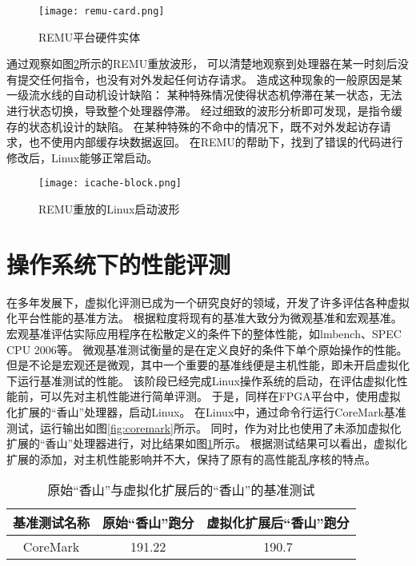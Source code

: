 \begin{figure}[htbp]
    \centering
\texttt{[image: remu-card.png]}
    \caption{REMU平台硬件实体}
    \label{fig:remu-card}
\end{figure}

通过观察如图\ref{fig:console-block-wave}所示的REMU重放波形，
可以清楚地观察到处理器在某一时刻后没有提交任何指令，也没有对外发起任何访存请求。
造成这种现象的一般原因是某一级流水线的自动机设计缺陷：
某种特殊情况使得状态机停滞在某一状态，无法进行状态切换，导致整个处理器停滞。
经过细致的波形分析即可发现，是指令缓存的状态机设计的缺陷。
在某种特殊的不命中的情况下，既不对外发起访存请求，也不使用内部缓存块数据返回。
在REMU的帮助下，找到了错误的代码进行修改后，Linux能够正常启动。

\begin{figure}[htbp]
    \centering
\texttt{[image: icache-block.png]}
    \caption{REMU重放的Linux启动波形}
    \label{fig:console-block-wave}
\end{figure}

\section{操作系统下的性能评测}
在多年发展下，虚拟化评测已成为一个研究良好的领域，开发了许多评估各种虚拟化平台性能的基准方法。
根据粒度将现有的基准大致分为微观基准和宏观基准。
宏观基准评估实际应用程序在松散定义的条件下的整体性能，如lmbench、SPEC CPU 2006等。
微观基准测试衡量的是在定义良好的条件下单个原始操作的性能。
但是不论是宏观还是微观，其中一个重要的基准线便是主机性能，即未开启虚拟化下运行基准测试的性能。
该阶段已经完成Linux操作系统的启动，在评估虚拟化性能前，可以先对主机性能进行简单评测。
于是，同样在FPGA平台中，使用虚拟化扩展的“香山”处理器，启动Linux。
在Linux中，通过命令行运行CoreMark基准测试，运行输出如图\ref{fig:coremark}所示。
同时，作为对比也使用了未添加虚拟化扩展的“香山”处理器进行，对比结果如图\ref{tab:perf}所示。
根据测试结果可以看出，虚拟化扩展的添加，对主机性能影响并不大，保持了原有的高性能乱序核的特点。

\begin{table}
    \centering
    \caption{原始“香山”与虚拟化扩展后的“香山”的基准测试}
    \begin{tabular}{ccc}
        \toprule
        基准测试名称   & 原始“香山”跑分 & 虚拟化扩展后“香山”跑分 \\
        \midrule
        CoreMark & 191.22   & 190.7        \\
        \bottomrule
    \end{tabular}
    \label{tab:perf}
\end{table}



